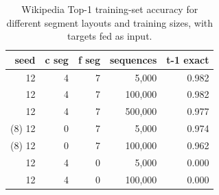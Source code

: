 \begin{table}[H]
\centering
\caption{Wikipedia Top-1 training-set accuracy for different segment layouts and training sizes, with targets fed as input.}
\label{tab:wiki-train-top1-accuracy-segmentLayouts}
\begin{tabular}{rrrrr}
\toprule
\textbf{seed} & \textbf{c seg} & \textbf{f seg} & \textbf{sequences} & \textbf{t-1 exact} \\
\midrule
12 & 4 & 7 & 5,000   & 0.982 \\
12 & 4 & 7 & 100,000 & 0.982 \\
12 & 4 & 7 & 500,000 & 0.977 \\
(8) 12 & 0 & 7 & 5,000   & 0.974 \\
(8) 12 & 0 & 7 & 100,000 & 0.962 \\
12 & 4 & 0 & 5,000   & 0.000 \\
12 & 4 & 0 & 100,000 & 0.000 \\
\bottomrule
\end{tabular}
\end{table}


